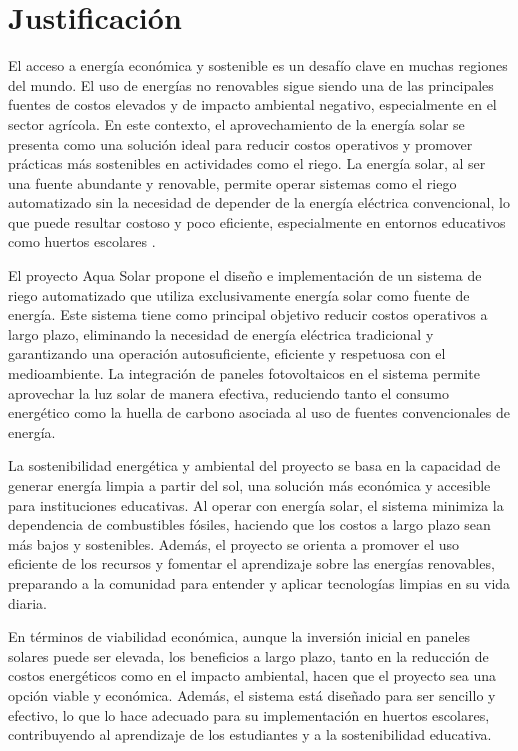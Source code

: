 \documentclass[12pt]{article}
\begin{document}
\newpage
\section{Justificación}
El acceso a energía económica y sostenible es un desafío clave en muchas regiones del mundo. El uso de energías no renovables sigue siendo una de las principales fuentes de costos elevados y de impacto ambiental negativo, especialmente en el sector agrícola. En este contexto, el aprovechamiento de la energía solar se presenta como una solución ideal para reducir costos operativos y promover prácticas más sostenibles en actividades como el riego. La energía solar, al ser una fuente abundante y renovable, permite operar sistemas como el riego automatizado sin la necesidad de depender de la energía eléctrica convencional, lo que puede resultar costoso y poco eficiente, especialmente en entornos educativos como huertos escolares \cite{Ideasmedioambientales2016}.

El proyecto Aqua Solar propone el diseño e implementación de un sistema de riego automatizado que utiliza exclusivamente energía solar como fuente de energía. Este sistema tiene como principal objetivo reducir costos operativos a largo plazo, eliminando la necesidad de energía eléctrica tradicional y garantizando una operación autosuficiente, eficiente y respetuosa con el medioambiente. La integración de paneles fotovoltaicos en el sistema permite aprovechar la luz solar de manera efectiva, reduciendo tanto el consumo energético como la huella de carbono asociada al uso de fuentes convencionales de energía.

La sostenibilidad energética y ambiental del proyecto se basa en la capacidad de generar energía limpia a partir del sol, una solución más económica y accesible para instituciones educativas. Al operar con energía solar, el sistema minimiza la dependencia de combustibles fósiles, haciendo que los costos a largo plazo sean más bajos y sostenibles. Además, el proyecto se orienta a promover el uso eficiente de los recursos y fomentar el aprendizaje sobre las energías renovables, preparando a la comunidad para entender y aplicar tecnologías limpias en su vida diaria.

En términos de viabilidad económica, aunque la inversión inicial en paneles solares puede ser elevada, los beneficios a largo plazo, tanto en la reducción de costos energéticos como en el impacto ambiental, hacen que el proyecto sea una opción viable y económica. Además, el sistema está diseñado para ser sencillo y efectivo, lo que lo hace adecuado para su implementación en huertos escolares, contribuyendo al aprendizaje de los estudiantes y a la sostenibilidad educativa. \cite{EIA2023}
\end{document}
